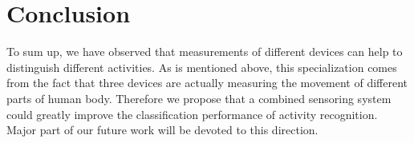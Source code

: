 \section{Conclusion}
\label{sec:conclusion}

To sum up, we have observed that measurements of different devices can help to distinguish different activities. As is mentioned above, this specialization comes from the fact that three devices are actually measuring the movement of different parts of human body. Therefore we propose that a combined sensoring system could greatly improve the classification performance of activity recognition. Major part of our future work will be devoted to this direction. 

